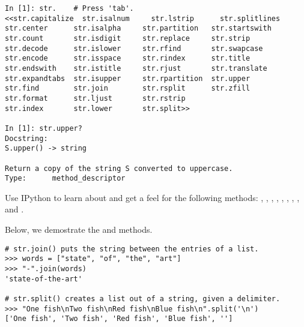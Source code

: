 \begin{lstlisting}
In [1]: str.    # Press 'tab'.
<<str.capitalize  str.isalnum     str.lstrip      str.splitlines
str.center      str.isalpha     str.partition   str.startswith
str.count       str.isdigit     str.replace     str.strip
str.decode      str.islower     str.rfind       str.swapcase
str.encode      str.isspace     str.rindex      str.title
str.endswith    str.istitle     str.rjust       str.translate
str.expandtabs  str.isupper     str.rpartition  str.upper
str.find        str.join        str.rsplit      str.zfill
str.format      str.ljust       str.rstrip      
str.index       str.lower       str.split>>

In [1]: str.upper?
Docstring:
S.upper() -> string

Return a copy of the string S converted to uppercase.
Type:      method_descriptor
\end{lstlisting}

Use IPython to learn about and get a feel for the following  methods: , , , , , , , , and .

Below, we demostrate the  and  methods.

\begin{lstlisting}
# str.join() puts the string between the entries of a list.
>>> words = ["state", "of", "the", "art"]
>>> "-".join(words)
'state-of-the-art'

# str.split() creates a list out of a string, given a delimiter.
>>> "One fish\nTwo fish\nRed fish\nBlue fish\n".split('\n')
['One fish', 'Two fish', 'Red fish', 'Blue fish', '']
\end{lstlisting}


